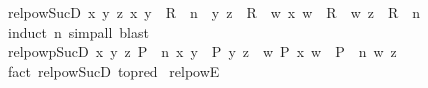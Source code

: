 \begin{isabellebody}
\ relpow{\isacharunderscore}{\kern0pt}Suc{\isacharunderscore}{\kern0pt}D{}{\isacharprime}{\kern0pt}{\isacharcolon}{\kern0pt}\ {\isachardoublequoteopen}{\isasymforall}x\ y\ z{\isachardot}{\kern0pt}\ {\isacharparenleft}{\kern0pt}x{\isacharcomma}{\kern0pt}\ y{\isacharparenright}{\kern0pt}\ {\isasymin}\ R\ {\isacharcircum}{\kern0pt}{\isacharcircum}{\kern0pt}\ n\ {\isasymand}\ {\isacharparenleft}{\kern0pt}y{\isacharcomma}{\kern0pt}\ z{\isacharparenright}{\kern0pt}\ {\isasymin}\ R\ {\isasymlongrightarrow}\ {\isacharparenleft}{\kern0pt}{\isasymexists}w{\isachardot}{\kern0pt}\ {\isacharparenleft}{\kern0pt}x{\isacharcomma}{\kern0pt}\ w{\isacharparenright}{\kern0pt}\ {\isasymin}\ R\ {\isasymand}\ {\isacharparenleft}{\kern0pt}w{\isacharcomma}{\kern0pt}\ z{\isacharparenright}{\kern0pt}\ {\isasymin}\ R\ {\isacharcircum}{\kern0pt}{\isacharcircum}{\kern0pt}\ n{\isacharparenright}{\kern0pt}{\isachardoublequoteclose}\isanewline
%
\isadelimproof
\ \ %
\endisadelimproof
%
\isatagproof
{}\isamarkupfalse%
\ {\isacharparenleft}{\kern0pt}induct\ n{\isacharparenright}{\kern0pt}\ {\isacharparenleft}{\kern0pt}simp{\isacharunderscore}{\kern0pt}all{\isacharcomma}{\kern0pt}\ blast{\isacharparenright}{\kern0pt}%
\endisatagproof
{\isafoldproof}%
%
\isadelimproof
\isanewline
%
\endisadelimproof
\isanewline
{}\isamarkupfalse%
\ relpowp{\isacharunderscore}{\kern0pt}Suc{\isacharunderscore}{\kern0pt}D{}{\isacharprime}{\kern0pt}{\isacharcolon}{\kern0pt}\ {\isachardoublequoteopen}{\isasymforall}x\ y\ z{\isachardot}{\kern0pt}\ {\isacharparenleft}{\kern0pt}P\ {\isacharcircum}{\kern0pt}{\isacharcircum}{\kern0pt}\ n{\isacharparenright}{\kern0pt}\ x\ y\ {\isasymand}\ P\ y\ z\ {\isasymlongrightarrow}\ {\isacharparenleft}{\kern0pt}{\isasymexists}w{\isachardot}{\kern0pt}\ P\ x\ w\ {\isasymand}\ {\isacharparenleft}{\kern0pt}P\ {\isacharcircum}{\kern0pt}{\isacharcircum}{\kern0pt}\ n{\isacharparenright}{\kern0pt}\ w\ z{\isacharparenright}{\kern0pt}{\isachardoublequoteclose}\isanewline
%
\isadelimproof
\ \ %
\endisadelimproof
%
\isatagproof
{}\isamarkupfalse%
\ {\isacharparenleft}{\kern0pt}fact\ relpow{\isacharunderscore}{\kern0pt}Suc{\isacharunderscore}{\kern0pt}D{}{\isacharprime}{\kern0pt}\ {\isacharbrackleft}{\kern0pt}to{\isacharunderscore}{\kern0pt}pred{\isacharbrackright}{\kern0pt}{\isacharparenright}{\kern0pt}%
\endisatagproof
{\isafoldproof}%
%
\isadelimproof
\isanewline
%
\endisadelimproof
\isanewline
{}\isamarkupfalse%
\ relpow{\isacharunderscore}{\kern0pt}E{}{\isacharcolon}{\kern0pt}\isanewline

\end{isabellebody}
